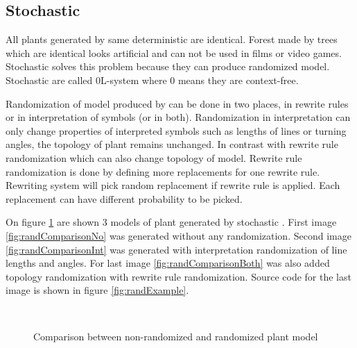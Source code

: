 \subsection{Stochastic \lsystems}

\newcommand{\zerolsystem}{\mbox{0L-system}\xspace}
\newcommand{\zerolsystems}{\mbox{0L-systems}\xspace}

All plants generated by same deterministic \lsystem are identical.
Forest made by trees which are identical looks artificial and can not be used in films or video games.
Stochastic \lsystems solves this problem because they can produce randomized model.
Stochastic \lsystems are called \zerolsystem where 0 means they are context-free.

Randomization of model produced by \lsystem can be done in two places, in rewrite rules or in interpretation of symbols (or in both).
Randomization in interpretation can only change properties of interpreted symbols such as lengths of lines or turning angles, the topology of plant remains unchanged.
In contrast with rewrite rule randomization which can also change topology of model.
Rewrite rule randomization is done by defining more replacements for one rewrite rule.
Rewriting system will pick random replacement if rewrite rule is applied.
Each replacement can have different probability to be picked.

On figure \ref{fig:randComparison} are shown 3 models of plant generated by stochastic \lsystems.
First image \ref{fig:randComparisonNo} was generated without any randomization.
Second image \ref{fig:randComparisonInt} was generated with interpretation randomization of line lengths and angles.
For last image \ref{fig:randComparisonBoth} was also added topology randomization with rewrite rule randomization.
Source code for the last image is shown in figure \ref{fig:randExample}.

\begin{figure}[ht]
	\centering
	 ~
	 ~
	\caption{Comparison between non-randomized and randomized plant model}
	\label{fig:randComparison}
\end{figure}

